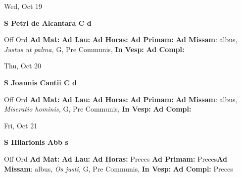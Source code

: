 \documentclass[10pt]{memoir}
\begin{document}
\begin{center}
\begin{minipage}{3.5in}
\vspace{2em}
\begin{center}Wed, Oct 19
\end{center}
\textbf{ \large S Petri de Alcantara C
\textnormal{\normalsize d}}

\begin{justify}Off Ord
\textbf{Ad Mat: }
\textbf{Ad Lau: }
\textbf{Ad Horas: }
\textbf{Ad Primam: }\textbf{Ad Missam}: albus, \textit{Justus ut palma,} G, Pre Communis, 
\textbf{In Vesp: }
\textbf{Ad Compl: }
\end{justify}
\end{minipage}
\end{center}

\begin{center}
\begin{minipage}{3.5in}
\vspace{2em}
\begin{center}Thu, Oct 20
\end{center}
\textbf{ \large S Joannis Cantii C
\textnormal{\normalsize d}}

\begin{justify}Off Ord
\textbf{Ad Mat: }
\textbf{Ad Lau: }
\textbf{Ad Horas: }
\textbf{Ad Primam: }\textbf{Ad Missam}: albus, \textit{Miseratio hominis,} G, Pre Communis, 
\textbf{In Vesp: }
\textbf{Ad Compl: }
\end{justify}
\end{minipage}
\end{center}

\begin{center}
\begin{minipage}{3.5in}
\vspace{2em}
\begin{center}Fri, Oct 21
\end{center}
\textbf{ \large S Hilarionis Abb
\textnormal{\normalsize s}}

\begin{justify}Off Ord
\textbf{Ad Mat: }
\textbf{Ad Lau: }
\textbf{Ad Horas: }Preces
\textbf{Ad Primam: }Preces\textbf{Ad Missam}: albus, \textit{Os justi,} G, Pre Communis, 
\textbf{In Vesp: }
\textbf{Ad Compl: }Preces
\end{justify}
\end{minipage}
\end{center}
\end{document}
